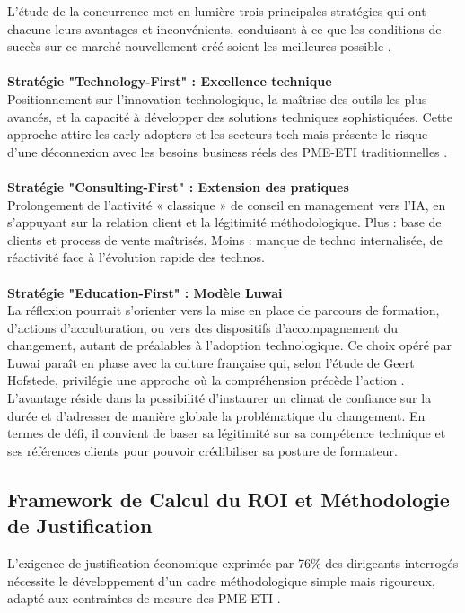  L’étude de la concurrence met en lumière trois principales stratégies qui ont chacune leurs avantages et inconvénients, conduisant à ce que les conditions de succès sur ce marché nouvellement créé soient les meilleures possible \cite{porter1985competitive}. 
\\\\
\textbf{Stratégie "Technology-First" : Excellence technique}\\
Positionnement sur l'innovation technologique, la maîtrise des outils les plus avancés, et la capacité à développer des solutions techniques sophistiquées. Cette approche attire les early adopters et les secteurs tech mais présente le risque d'une déconnexion avec les besoins business réels des PME-ETI traditionnelles \cite{christensen1997innovator}.
\\\\
\textbf{Stratégie "Consulting-First" : Extension des pratiques}\\
Prolongement de l’activité « classique » de conseil en management vers l’IA, en s’appuyant sur la relation client et la légitimité méthodologique. Plus : base de clients et process de vente maîtrisés. Moins : manque de techno internalisée, de réactivité face à l’évolution rapide des technos.
\\\\
\textbf{Stratégie "Education-First" : Modèle Luwai}\\
La réflexion pourrait s’orienter vers la mise en place de parcours de formation, d’actions d’acculturation, ou vers des dispositifs d’accompagnement du changement, autant de préalables à l’adoption technologique. Ce choix opéré par Luwai paraît en phase avec la culture française qui, selon l’étude de Geert Hofstede, privilégie une approche où la compréhension précède l’action \cite{hofstede2001culture}. L’avantage réside dans la possibilité d’instaurer un climat de confiance sur la durée et d’adresser de manière globale la problématique du changement. En termes de défi, il convient de baser sa légitimité sur sa compétence technique et ses références clients pour pouvoir crédibiliser sa posture de formateur.


\subsection{Framework de Calcul du ROI et Méthodologie de Justification}

L'exigence de justification économique exprimée par 76\% des dirigeants interrogés nécessite le développement d'un cadre méthodologique simple mais rigoureux, adapté aux contraintes de mesure des PME-ETI \cite{kaplan1996balanced}.

